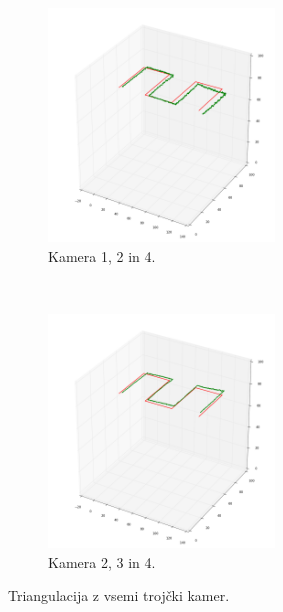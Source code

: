 \documentclass[a4paper, 12pt]{book}
\begin{document}
\begin{figure}
    \begin{subfigure}[t]{0.5\textwidth}
        \centering
        \includegraphics[width=6cm]{124.png}
        \caption{Kamera 1, 2 in 4.}
    \end{subfigure}~
    \begin{subfigure}[t]{0.5\textwidth}
        \centering
        \includegraphics[width=6cm]{234.png}
        \caption{Kamera 2, 3 in 4.}
    \end{subfigure}
    \caption{Triangulacija z vsemi trojčki kamer.}
\end{figure}
\end{document}
